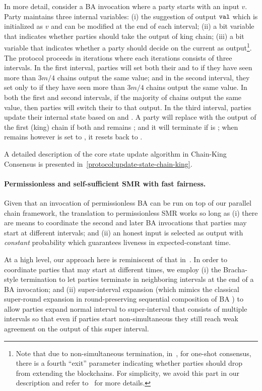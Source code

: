 In more detail, consider a BA invocation where a party \party starts with an input $v$.
%
Party \party maintains three internal variables:
%
(i) the suggestion of output $\mathtt{val}$ which is initialized as $v$ and can be modified at the end of each interval;
%
(ii) a bit variable \lock that indicates whether parties should take the output of king chain;
%
(iii) a bit variable \decide that indicates whether a party \party should decide on the current \val as output\footnote{Note that due to non-simultaneous termination, in~\cite{EC:GarKiaShe24}, for one-shot consensus, there is a fourth ``exit'' parameter indicating whether parties should drop from extending the blockchains. For simplicity, we avoid this part in our description and refer to~\cite{EC:GarKiaShe24} for more details.}.
%
The protocol proceeds in iterations where each iterations consists of three intervals.
%
In the first interval, parties will set both their \decide and \lock to \true if they have seen more than $3 m/ 4$ chains output the same value; and in the second interval, they set only \lock to \true if they have seen more than $3 m/ 4$ chains output the same value.
%
In both the first and second intervals, if the majority of chains output the same value, then parties will switch their \val to that output.
%
In the third interval, parties update their internal state based on \decide and \lock.
%
A party will replace \val with the output of the first (king) chain if both \decide and \lock remains \false; and it will terminate if \decide is \true;
when \decide remains \false however \lock is set to \true, it resets \lock back to \false.

A detailed description of the core state update algorithm in Chain-King Consensus is presented in~\cref{protocol:update-state-chain-king}.

\paragraph{Permissionless and self-sufficient SMR with fast fairness.}
%
Given that an invocation of permissionless BA can be run on top of our parallel chain framework, the translation to permissionless SMR works so long as (i) there are means to coordinate the second and later BA invocations that parties may start at different intervals; and (ii) an honest input is selected as output with \emph{constant} probability which guarantees liveness in expected-constant time.

At a high level, our approach here is reminiscent of that in~\cite{EC:GarKiaShe24}.
%
In order to coordinate parties that may start at different times, we employ
%
(i) the Bracha-style termination \cite{PODC:Bracha84} to let parties terminate in neighboring intervals at the end of a BA invocation;
%
and (ii) super-interval expansion (which mimics the classical super-round expansion in round-preserving sequential composition of BA \cite{JC:CCGZ19}) to allow parties expand normal interval to super-interval that consists of multiple intervals so that even if parties start non-simultaneous they still reach weak agreement on the output of this super interval.

